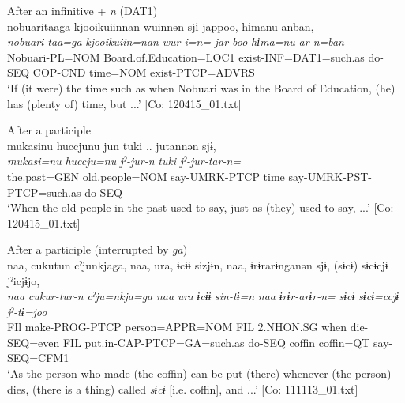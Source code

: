   \ex After an infinitive + \textit{n} (DAT1)\\
      \glll    nobuaritaaga  {\textbar}kjooikuiin{\textbar}nan  wuinnən  sjɨ  jappoo,  hɨmanu  anban,\\
    \textit{nobuari-taa=ga}  \textit{kjooikuiin=nan}  \textit{wur-i=n=}  \textit{}  \textit{jar-boo}  \textit{hɨma=nu}  \textit{ar-n=ban}\\
    Nobuari-PL=NOM  Board.of.Education=LOC1  exist-INF=DAT1=such.as  do-SEQ  COP-CND  time=NOM  exist-PTCP=ADVRS\\
\glt     ‘If (it were) the time such as when Nobuari was in the Board of Education, (he) has (plenty of) time, but ...’  [Co: 120415\_01.txt]

  \ex After a participle\\
      \glll    mukasinu  huccjunu  jun  tuki ..   jutannən  sjɨ,\\
    \textit{mukasi=nu}  \textit{huccju=nu}  \textit{jˀ-jur-n}  \textit{tuki} \textit{jˀ-jur-tar-n=}  \textit{}\\
    the.past=GEN  old.people=NOM  say-UMRK-PTCP  time  say-UMRK-PST-PTCP=such.as  do-SEQ\\
\glt     ‘When the old people in the past used to say, just as (they) used to say, ...’  [Co: 120415\_01.txt]

  \ex After a participle (interrupted by \textit{ga})\\
      \glll    naa,  cukutun  cˀjunkjaga,  naa,  ura,  ɨcɨɨ  sizjɨn,  naa,  ɨrɨrarɨnganən  sjɨ,  (sɨcɨ)  sɨcɨcjɨ  jˀicjɨjo,\\                                                                                                                                                                                                      
    \textit{naa}  \textit{cukur-tur-n}  \textit{cˀju=nkja=ga}  \textit{naa}  \textit{ura}  \textit{ɨcɨɨ} \textit{sin-tɨ=n}  \textit{naa}  \textit{ɨrɨr-arɨr-n=}  \textit{}  \textit{sɨcɨ} \textit{sɨcɨ=ccjɨ}  \textit{jˀ-tɨ=joo}\\                                                                                                                                                                                                      
    FIl  make-PROG-PTCP  person=APPR=NOM  FIL  2.NHON.SG  when   die-SEQ=even  FIL  put.in-CAP-PTCP=GA=such.as  do-SEQ  coffin  coffin=QT  say-SEQ=CFM1\\
    \glt ‘As the person who made (the coffin) can be put (there) whenever (the person) dies, (there is a thing) called \textit{sɨcɨ} [i.e. coffin], and ...’ [Co: 111113\_01.txt]
    \z
\z

